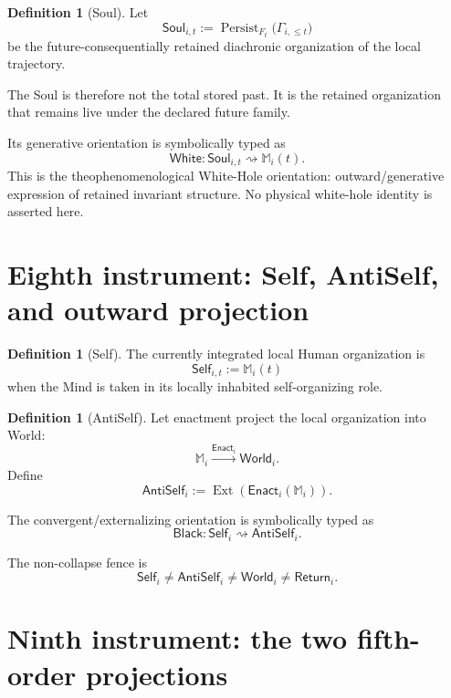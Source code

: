 \documentclass[10pt]{article}
\theoremstyle{pe}
\theoremstyle{definition}
\newtheorem{definition}[theorem]{Definition}
\newcommand{\Persist}{\operatorname{Persist}}
\newcommand{\Ext}{\operatorname{Ext}}
\newcommand{\World}{\mathsf{World}}
\newcommand{\Return}{\mathsf{Return}}
\newcommand{\Soul}{\mathsf{Soul}}
\newcommand{\Self}{\mathsf{Self}}
\newcommand{\AntiSelf}{\mathsf{AntiSelf}}
\newcommand{\White}{\mathsf{White}}
\newcommand{\Black}{\mathsf{Black}}
\begin{document}
\begin{definition}[Soul]
Let
\begin{equation}\label{eq:soul}
  \Soul_{i,t}
  :=
  \Persist_{F_t}\bigl(\Gamma_{i,\le t}\bigr)
\end{equation}
be the future-consequentially retained diachronic organization of the local trajectory.
\end{definition}

The Soul is therefore not the total stored past.  It is the retained organization that remains live under the declared future family.

Its generative orientation is symbolically typed as
\[
  \boxed{
  \White:
  \Soul_{i,t}
  \rightsquigarrow
  \mathbb M_i(t).
  }
\]
This is the theophenomenological White-Hole orientation: outward/generative expression of retained invariant structure.  No physical white-hole identity is asserted here.

\section{Eighth instrument: Self, AntiSelf, and outward projection}

\begin{definition}[Self]
The currently integrated local Human organization is
\[
  \Self_{i,t}:=\mathbb M_i(t)
\]
when the Mind is taken in its locally inhabited self-organizing role.
\end{definition}

\begin{definition}[AntiSelf]
Let enactment project the local organization into World:
\[
  \mathbb M_i
  \xrightarrow{\mathsf{Enact}_i}
  \World_i.
\]
Define
\begin{equation}\label{eq:antiself}
  \AntiSelf_i
  :=
  \Ext\!\left(\mathsf{Enact}_i(\mathbb M_i)\right).
\end{equation}
\end{definition}

The convergent/externalizing orientation is symbolically typed as
\[
  \boxed{
  \Black:
  \Self_i
  \rightsquigarrow
  \AntiSelf_i.
  }
\]

The non-collapse fence is
\[
  \boxed{
  \Self_i
  \neq
  \AntiSelf_i
  \neq
  \World_i
  \neq
  \Return_i.
  }
\]

\section{Ninth instrument: the two fifth-order projections}
\end{document}
